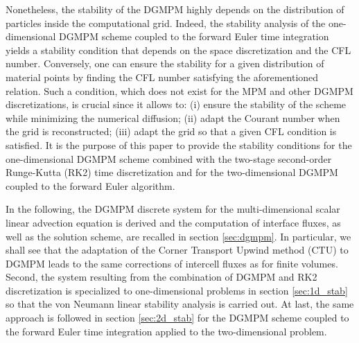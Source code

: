 Nonetheless, the stability of the DGMPM highly depends on the distribution of particles inside the computational grid.
Indeed, the stability analysis of the one-dimensional DGMPM scheme coupled to the forward Euler time integration \cite{DGMPM} yields a stability condition that depends on the space discretization and the CFL number.
%
Conversely, one can ensure the stability for a given distribution of material points by finding the CFL number satisfying the aforementioned relation.
%
Such a condition, which does not exist for the MPM and other DGMPM discretizations, is crucial since it allows to: (i) ensure the stability of the scheme while minimizing the numerical diffusion; (ii) adapt the Courant number when the grid is reconstructed; (iii) adapt the grid so that a given CFL condition is satisfied.
It is the purpose of this paper to provide the stability conditions for the one-dimensional DGMPM scheme combined with the two-stage second-order Runge-Kutta (RK2) time discretization and for the two-dimensional DGMPM coupled to the forward Euler algorithm.

In the following, the DGMPM discrete system for the multi-dimensional scalar linear advection equation is derived and the computation of interface fluxes, as well as the solution scheme, are recalled in section \ref{sec:dgmpm}.
In particular, we shall see that the adaptation of the Corner Transport Upwind method (CTU) \cite{Colella_CTU} to DGMPM leads to the same corrections of intercell fluxes as for finite volumes.
Second, the system resulting from the combination of DGMPM and RK2 discretization is specialized to one-dimensional problems in section \ref{sec:1d_stab} so that the von Neumann linear stability analysis is carried out.
At last, the same approach is followed in section \ref{sec:2d_stab} for the DGMPM scheme coupled to the forward Euler time integration applied to the two-dimensional problem.


